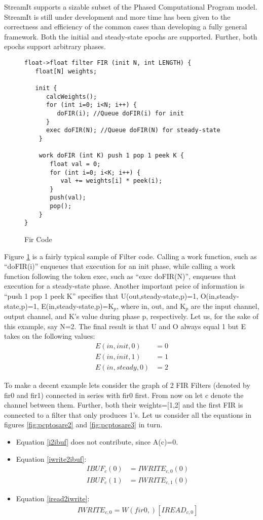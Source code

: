 StreamIt supports a sizable subset of the Phased Computational Program model. StreamIt is still under development and more time has been given to the correctness and efficiency of the common cases than developing a fully general framework. Both the initial and steady-state epochs are supported. Further, both epochs support arbitrary phases.
\begin{figure}[t]
\begin{verbatim}
float->float filter FIR (init N, int LENGTH) {
   float[N] weights;

   init {
      calcWeights();
      for (int i=0; i<N; i++) {
         doFIR(i); //Queue doFIR(i) for init
      }
      exec doFIR(N); //Queue doFIR(N) for steady-state
    }

    work doFIR (int K) push 1 pop 1 peek K {
       float val = 0;
       for (int i=0; i<K; i++) {
          val += weights[i] * peek(i);
       }
       push(val);
       pop();
    }
}
\end{verbatim}
\caption{Fir Code
\protect\label{fig:fir}}
\end{figure}

Figure \ref{fig:fir} is a fairly typical sample of Filter code. Calling a work function, such as ``doFIR(i)'' enqueues that execution for an init phase, while calling a work function following the token exec, such as ``exec doFIR(N)'', enqueues that execution for a steady-state phase. Another important peice of information is ``push 1 pop 1 peek K'' specifies that U(out,steady-state,p)=1, O(in,steady-state,p)=1, E(in,steady-state,p)=K$_p$, where in, out, and K$_p$ are the input channel, output channel, and K's value during phase p, respectively. Let us, for the sake of this example, say N=2. The final result is that U and O always equal 1 but E takes on the following values:
\begin{align}
E(in,init,0)&=0\nonumber\\
E(in,init,1)&=1\nonumber\\
E(in,steady,0)&=2\nonumber
\end{align}

To make a decent example lets consider the graph of 2 FIR Filters (denoted by fir0 and fir1) connected in series with fir0 first. From now on let c denote the channel between them. Further, both their weights=[1,2] and the first FIR is connected to a filter that only produces 1's. Let us consider all the equations in figures \ref{fig:pcptosare2} and \ref{fig:pcptosare3} in turn.
\begin{itemize}
\item Equation \ref{i2ibuf} does not contribute, since A(c)=0.
\item Equation \ref{iwrite2ibuf}:
\begin{align}
IBUF_c(0)&=IWRITE_{c,0}(0)\nonumber\\
IBUF_c(1)&=IWRITE_{c,1}(0)\nonumber
\end{align}
\item Equation \ref{iread2iwrite}:
\begin{align}
IWRITE_{c,0}=W(fir0,)[IREAD_{c,0}]
\end{align}
\end{itemize}